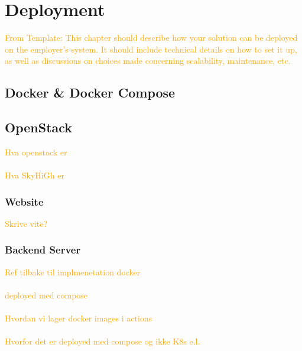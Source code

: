 \chapter{Deployment}\label{chap:deployment}

\textcolor{orange}{From Template: This chapter should describe how your solution can be deployed on the employer's system. It should include technical details on how to set it up, as well as discussions on choices made concerning scalability, maintenance, etc.}

\section{Docker \& Docker Compose}

\section{OpenStack}\label{sec:deployment:openstack}

\textcolor{orange}{
Hva openstack er \\ \\
Hva SkyHiGh er
}

\subsection{Website}\label{subsec:deployment:docker:website}

\textcolor{orange}{Skrive vite?}

\subsection{Backend Server}\label{subsec:deployment:docker:backendserver}

\textcolor{orange}{
Ref tilbake til implmenetation docker \\ \\
deployed med compose \\ \\
Hvordan vi lager docker images i actions \\ \\
Hvorfor det er deployed med compose og ikke K8s e.l. 
}
